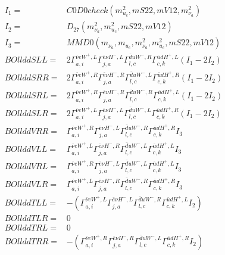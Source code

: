 \documentclass[A4,landscape]{article}
\begin{document}
\begin{align} 
I_1 = & C0D0check(m^2_{u_{{c}}}, mS22, mV12, m^2_{\nu_{{a}}}) \\ 
I_2 = & D_{27}(m^2_{\nu_{{a}}}, m^2_{u_{{c}}}, mS22, mV12) \\ 
I_3 = & MMD0(m_{\nu_{{a}}}, m_{u_{{c}}}, m^2_{\nu_{{a}}}, m^2_{u_{{c}}}, mS22, mV12) \\ 
  BOllddSLL= & 2  \Gamma^{\bar{\nu}e W^+ ,L}_{a, i} \Gamma^{\bar{e}\nu H^-,L}_{j, a} \Gamma^{\bar{d}u W^-,R}_{l, c} \Gamma^{\bar{u}d H^+ ,L}_{c, k} (I_1 - 2 I_2) \\ 
  BOllddSRR= & 2  \Gamma^{\bar{\nu}e W^+ ,R}_{a, i} \Gamma^{\bar{e}\nu H^-,R}_{j, a} \Gamma^{\bar{d}u W^-,L}_{l, c} \Gamma^{\bar{u}d H^+ ,R}_{c, k} (I_1 - 2 I_2) \\ 
  BOllddSRL= & 2  \Gamma^{\bar{\nu}e W^+ ,R}_{a, i} \Gamma^{\bar{e}\nu H^-,R}_{j, a} \Gamma^{\bar{d}u W^-,R}_{l, c} \Gamma^{\bar{u}d H^+ ,L}_{c, k} (I_1 - 2 I_2) \\ 
  BOllddSLR= & 2  \Gamma^{\bar{\nu}e W^+ ,L}_{a, i} \Gamma^{\bar{e}\nu H^-,L}_{j, a} \Gamma^{\bar{d}u W^-,L}_{l, c} \Gamma^{\bar{u}d H^+ ,R}_{c, k} (I_1 - 2 I_2) \\ 
  BOllddVRR= &  \Gamma^{\bar{\nu}e W^+ ,R}_{a, i} \Gamma^{\bar{e}\nu H^-,L}_{j, a} \Gamma^{\bar{d}u W^-,R}_{l, c} \Gamma^{\bar{u}d H^+ ,R}_{c, k} I_3 \\ 
  BOllddVLL= &  \Gamma^{\bar{\nu}e W^+ ,L}_{a, i} \Gamma^{\bar{e}\nu H^-,R}_{j, a} \Gamma^{\bar{d}u W^-,L}_{l, c} \Gamma^{\bar{u}d H^+ ,L}_{c, k} I_3 \\ 
  BOllddVRL= &  \Gamma^{\bar{\nu}e W^+ ,R}_{a, i} \Gamma^{\bar{e}\nu H^-,L}_{j, a} \Gamma^{\bar{d}u W^-,L}_{l, c} \Gamma^{\bar{u}d H^+ ,L}_{c, k} I_3 \\ 
  BOllddVLR= &  \Gamma^{\bar{\nu}e W^+ ,L}_{a, i} \Gamma^{\bar{e}\nu H^-,R}_{j, a} \Gamma^{\bar{d}u W^-,R}_{l, c} \Gamma^{\bar{u}d H^+ ,R}_{c, k} I_3 \\ 
  BOllddTLL= & -( \Gamma^{\bar{\nu}e W^+ ,L}_{a, i} \Gamma^{\bar{e}\nu H^-,L}_{j, a} \Gamma^{\bar{d}u W^-,R}_{l, c} \Gamma^{\bar{u}d H^+ ,L}_{c, k} I_2) \\ 
  BOllddTLR= & 0 \\ 
  BOllddTRL= & 0 \\ 
  BOllddTRR= & -( \Gamma^{\bar{\nu}e W^+ ,R}_{a, i} \Gamma^{\bar{e}\nu H^-,R}_{j, a} \Gamma^{\bar{d}u W^-,L}_{l, c} \Gamma^{\bar{u}d H^+ ,R}_{c, k} I_2) \\ 
\end{align} 
\end{document}
